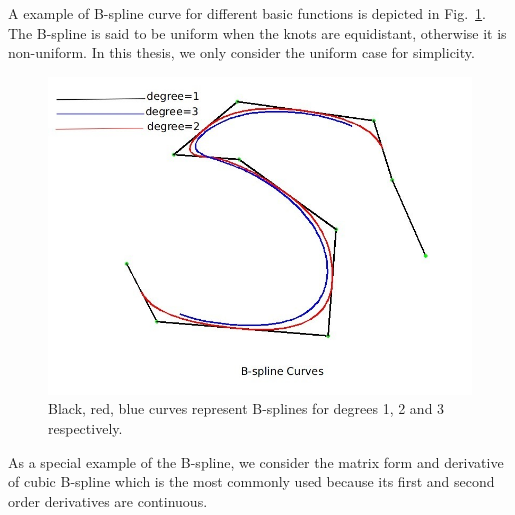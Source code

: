 A example of B-spline curve for different basic functions is depicted
in Fig.~\ref{fig:bspline}. The B-spline is said to be uniform when the knots are equidistant,
otherwise it is non-uniform. In this thesis, we only
consider the uniform case for simplicity.
\begin{figure}[htb]
  \centering
  \includegraphics[width=12cm]{images/bspline.jpg}
  \caption[B-spline curves for different
  degrees~\cite{contourpanin2011}]{Black, red, blue curves represent B-splines for degrees 1, 2 and 3 respectively.}
\label{fig:bspline}
\end{figure}

As a special example of the B-spline, we consider the matrix form and
derivative of cubic B-spline which is the most commonly used because
its first and second order derivatives are continuous.



